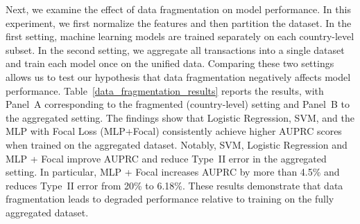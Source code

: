 Next, we examine the effect of data fragmentation on model performance. In this experiment, we first normalize the features and then partition the dataset. In the first setting, machine learning models are trained separately on each country-level subset. In the second setting, we aggregate all transactions into a single dataset and train each model once on the unified data. Comparing these two settings allows us to test our hypothesis that data fragmentation negatively affects model performance. Table~\ref{data_fragmentation_results} reports the results, with Panel~A corresponding to the fragmented (country-level) setting and Panel~B to the aggregated setting. The findings show that Logistic Regression, SVM, and the MLP with Focal Loss (MLP+Focal) consistently achieve higher AUPRC scores when trained on the aggregated dataset. Notably, SVM, Logistic Regression and MLP + Focal improve AUPRC and reduce Type~II error in the aggregated setting. In particular, MLP + Focal increases AUPRC by more than 4.5\% and reduces Type~II error from 20\% to 6.18\%. These results demonstrate that data fragmentation leads to degraded performance relative to training on the fully aggregated dataset.
 

